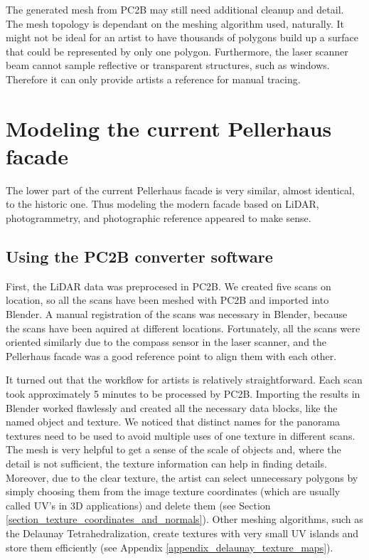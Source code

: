 The generated mesh from PC2B may still need additional cleanup and detail. The mesh topology is dependant on the meshing algorithm used, naturally. It might not be ideal for an artist to have thousands of polygons build up a surface that could be represented by only one polygon. Furthermore, the laser scanner beam cannot sample reflective or transparent structures, such as windows. Therefore it can only provide artists a reference for manual tracing.

\section{Modeling the current Pellerhaus facade}

The lower part of the current Pellerhaus facade is very similar, almost identical, to the historic one. Thus modeling the modern facade based on LiDAR, photogrammetry, and photographic reference appeared to make sense.

\subsection{Using the PC2B converter software}

First, the LiDAR data was preprocesed in PC2B. We created five scans on location, so all the scans have been meshed with PC2B and imported into Blender. A manual registration of the scans was necessary in Blender, because the scans have been aquired at different locations. Fortunately, all the scans were oriented similarly due to the compass sensor in the laser scanner, and the Pellerhaus facade was a good reference point to align them with each other.

It turned out that the workflow for artists is relatively straightforward. Each scan took approximately 5 minutes to be processed by PC2B. Importing the results in Blender worked flawlessly and created all the necessary data blocks, like the named object and texture. We noticed that distinct names for the panorama textures need to be used to avoid multiple uses of one texture in different scans. The mesh is very helpful to get a sense of the scale of objects and, where the detail is not sufficient, the texture information can help in finding details. Moreover, due to the clear texture, the artist can select unnecessary polygons by simply choosing them from the image texture coordinates (which are usually called UV's in 3D applications) and delete them (see Section \ref{section_texture_coordinates_and_normals}). Other meshing algorithms, such as the Delaunay Tetrahedralization, create textures with very small UV islands and store them efficiently (see Appendix \ref{appendix_delaunay_texture_maps}).

